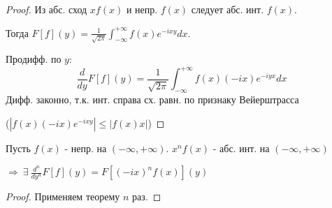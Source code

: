 \documentclass{article}
\theoremstyle{definition}
\numberwithin{theorem}{section}
\numberwithin{lemma}{section}
\numberwithin{definition}{section}
\numberwithin{corollary}{section}
\numberwithin{equation}{section}
\let\implies\Rightarrow
\begin{document}
\begin{proof}
  Из абс. сход $xf(x)$ и непр. $f(x)$ следует абс. инт. $f(x)$.

  Тогда $F[f](y)=\frac{1}{\sqrt{2\pi}}\int_{-\infty}^{+\infty}f(x)e^{-ixy}dx$.

Продифф. по $y$:
\[
  \frac{d}{dy}F[f](y)=\frac{1}{\sqrt{2\pi}}\int_{-\infty}^{+\infty}f(x)(-ix)e^{-iyx}dx
\]
Дифф. законно, т.к. инт. справа сх. равн. по признаку Вейерштрасса 

($|f(x)(-ix)e^{-ixy}|\le|f(x)x|$)
\end{proof}
\begin{corollary}
  Пусть $f(x)$ - непр. на $(-\infty,+\infty)$. $x^{n}f(x)$ - абс. инт. на $(-\infty,+\infty)$

  $\implies \ \exists \ \frac{d^{n}}{dy^{n}}F[f](y)=F[(-ix)^{n}f(x)](y)$
\end{corollary}
\begin{proof}
  Применяем теорему $n$ раз.
\end{proof}

\end{document}
